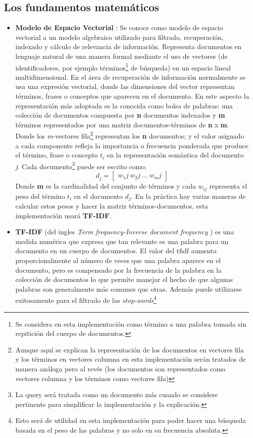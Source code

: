 \documentclass{article}
\begin{document}
\subsection{Los fundamentos matemáticos}
\begin{itemize}
\item \textbf{Modelo de Espacio Vectorial} : Se conoce como modelo de espacio vectorial a un modelo algebraico utilizado para filtrado, recuperación, indexado y cálculo de relevancia de información. Representa documentos en lenguaje natural de una manera formal mediante el uso de vectores (de identificadores, por ejemplo términos\footnote{Se considera en esta implementación como término a una palabra tomada sin repitición del cuerpo de documentos.} de búsqueda) en un espacio lineal multidimensional.
En el área de recuperación de información normalmente se usa una expresión vectorial, donde las dimensiones del vector representan términos, frases o conceptos que aparecen en el documento. En este aspecto la representación más adoptada es la conocida como bolsa de palabras: una colección de documentos compuesta por \textbf{n} documentos indexados y \textbf{m} términos representados por una matriz documentos-términos de \textbf{n} x \textbf{m}. Donde los \textit{m}-vectores fila\footnote{Aunque aquí se explican la representación de los documentos en vectores fila y los términos en vectores columna en esta implementación serán tratados de manera análoga pero al revés (los documentos son representados como vectores columna y los términos como vectores fila) } representan los \textbf{n} documentos; y el valor asignado a cada componente refleja la importancia o frecuencia ponderada que produce el término, frase o concepto $t_{i}$ en la representación semántica del documento \textit{j}.
Cada documento\footnote{La query será tratada como un documento más cuando se considere pertinente para simplificar la implementación y la explicación.} puede ser escrito como:
\begin{equation}\label{eq:1} d_{j} = \begin{bmatrix} w_1j \ w_2j \ \hdots \ w_mj \end{bmatrix} 
\end{equation} 
Donde \textbf{m} es la cardinalidad del conjunto de términos y cada $w_{ij}$ representa el peso del término $t_{i}$ en el documento $d_{j}$. En la práctica hay varias maneras de calcular estos pesos y hacer la matriz términos-documentos, esta implementación usará \textbf{TF-IDF}.
\item \textbf{TF-IDF} (del ingles \textit{Term frequency-Inverse document frequency }) es una medida numérica que expresa que tan relevante es una palabra para un documento en un cuerpo de documentos. El valor del tfidf aumenta proporcionalmente al número de veces que una palabra aparece en el documento, pero es compensado por la frecuencia de la palabra en la colección de documentos lo que permite manejar el hecho de que algunas palabras son generalmente más comunes que otras. Además puede utilizarse exitosamente para el filtrado de las \textit{stop-words}\footnote{Esto será de utilidad en esta implementación para poder hacer una búsqueda basada en el peso de las palabras y no solo en su frecuencia absoluta.}

\end{itemize}
\end{document}
